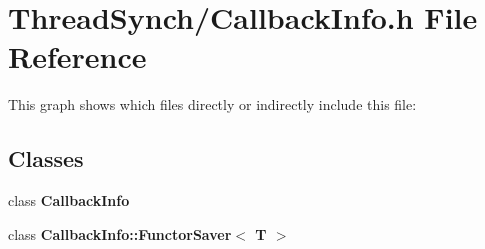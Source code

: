 \section{Thread\-Synch/Callback\-Info.h File Reference}
\label{_callback_info_8h}


This graph shows which files directly or indirectly include this file:\subsection*{Classes}
\begin{CompactItemize}
\item 
class {\bf Callback\-Info}
\item 
class {\bf Callback\-Info::Functor\-Saver$<$ T $>$}
\end{CompactItemize}
